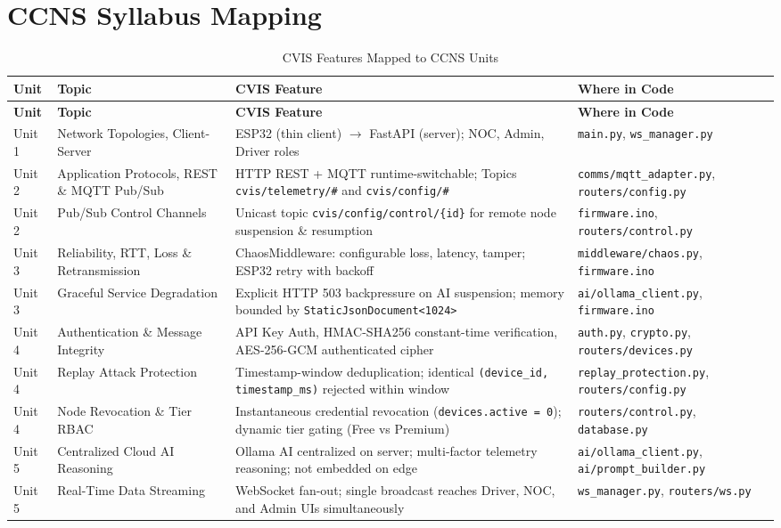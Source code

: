 \documentclass[12pt,a4paper]{report}
\begin{document}
\chapter{CCNS Syllabus Mapping}

{\small
\setlength{\tabcolsep}{3.5pt}
\begin{longtable}{L{1.4cm} L{3.6cm} L{4.9cm} L{4.9cm}}
\caption{CVIS Features Mapped to CCNS Units} \label{tab:ccns} \\
\toprule
\textbf{Unit} & \textbf{Topic} & \textbf{CVIS Feature} & \textbf{Where in Code} \\
\midrule
\endfirsthead
\toprule
\textbf{Unit} & \textbf{Topic} & \textbf{CVIS Feature} & \textbf{Where in Code} \\
\midrule
\endhead
\midrule
\endfoot
\bottomrule
\endlastfoot

Unit 1 & Network Topologies, Client-Server & ESP32 (thin client) $\rightarrow$ FastAPI (server); NOC, Admin, Driver roles & \texttt{main.py}, \texttt{ws\_manager.py} \\
\midrule
Unit 2 & Application Protocols, REST \& MQTT Pub/Sub & HTTP REST + MQTT runtime-switchable; Topics \texttt{cvis/telemetry/\#} and \texttt{cvis/config/\#} & \texttt{comms/mqtt\_adapter.py}, \texttt{routers/config.py} \\
\midrule
Unit 2 & Pub/Sub Control Channels & Unicast topic \texttt{cvis/config/control/\{id\}} for remote node suspension \& resumption & \texttt{firmware.ino}, \texttt{routers/control.py} \\
\midrule
Unit 3 & Reliability, RTT, Loss \& Retransmission & ChaosMiddleware: configurable loss, latency, tamper; ESP32 retry with backoff & \texttt{middleware/chaos.py}, \texttt{firmware.ino} \\
\midrule
Unit 3 & Graceful Service Degradation & Explicit HTTP 503 backpressure on AI suspension; memory bounded by \texttt{StaticJsonDocument<1024>} & \texttt{ai/ollama\_client.py}, \texttt{firmware.ino} \\
\midrule
Unit 4 & Authentication \& Message Integrity & API Key Auth, HMAC-SHA256 constant-time verification, AES-256-GCM authenticated cipher & \texttt{auth.py}, \texttt{crypto.py}, \texttt{routers/devices.py} \\
\midrule
Unit 4 & Replay Attack Protection & Timestamp-window deduplication; identical \texttt{(device\_id, timestamp\_ms)} rejected within window & \texttt{replay\_protection.py}, \texttt{routers/config.py} \\
\midrule
Unit 4 & Node Revocation \& Tier RBAC & Instantaneous credential revocation (\texttt{devices.active = 0}); dynamic tier gating (Free vs Premium) & \texttt{routers/control.py}, \texttt{database.py} \\
\midrule
Unit 5 & Centralized Cloud AI Reasoning & Ollama AI centralized on server; multi-factor telemetry reasoning; not embedded on edge & \texttt{ai/ollama\_client.py}, \texttt{ai/prompt\_builder.py} \\
\midrule
Unit 5 & Real-Time Data Streaming & WebSocket fan-out; single broadcast reaches Driver, NOC, and Admin UIs simultaneously & \texttt{ws\_manager.py}, \texttt{routers/ws.py} \\


\end{longtable}}
\end{document}
